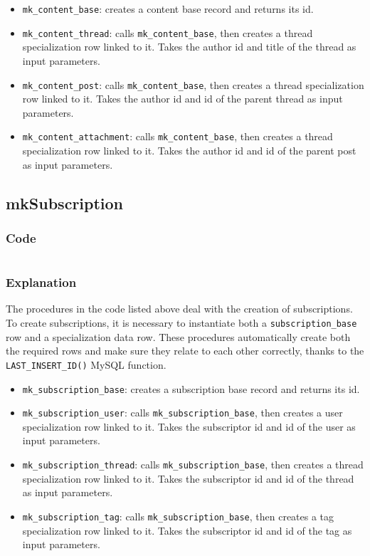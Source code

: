 \documentclass[12pt]{report}
\newcommand{\printSQLtest}[1]
{
    \inputminted[linenos, breaklines, breakbytoken, tabsize=4, fontsize=\footnotesize]{mysql}{#1}
}
\newcommand{\printSQLTablepage}[2]
{    
    \subsection{#2}
    \subsubsection{Code}
    \printSQLtest{../sql/parts/#1}
    \subsubsection{Explanation}
}
\begin{document}
                    \begin{itemize}
                        \item \texttt{mk_content_base}: creates a content base record and returns its id.
                        \item \texttt{mk_content_thread}: calls \texttt{mk_content_base}, then creates a thread specialization row linked to it.
                        Takes the author id and title of the thread as input parameters.
                        \item \texttt{mk_content_post}: calls \texttt{mk_content_base}, then creates a thread specialization row linked to it.
                        Takes the author id and id of the parent thread as input parameters.
                        \item \texttt{mk_content_attachment}: calls \texttt{mk_content_base}, then creates a thread specialization row linked to it.
                        Takes the author id and id of the parent post as input parameters.
                    \end{itemize}

                \newpage

                \printSQLTablepage{22_procsMkSubscription.sql}{mkSubscription}
                    The procedures in the code listed above deal with the creation of subscriptions. To create subscriptions, it is necessary to instantiate both a \texttt{subscription_base} row and a specialization data row.
                    These procedures automatically create both the required rows and make sure they relate to each other correctly, thanks to the \texttt{LAST_INSERT_ID()} MySQL function.

                    \begin{itemize}
                        \item \texttt{mk_subscription_base}: creates a subscription base record and returns its id.
                         \item \texttt{mk_subscription_user}: calls \texttt{mk_subscription_base}, then creates a user specialization row linked to it.
                        Takes the subscriptor id and id of the user as input parameters.
                        \item \texttt{mk_subscription_thread}: calls \texttt{mk_subscription_base}, then creates a thread specialization row linked to it.
                        Takes the subscriptor id and id of the thread as input parameters.
                        \item \texttt{mk_subscription_tag}: calls \texttt{mk_subscription_base}, then creates a tag specialization row linked to it.
                        Takes the subscriptor id and id of the tag as input parameters.
                    \end{itemize}
\end{document}
